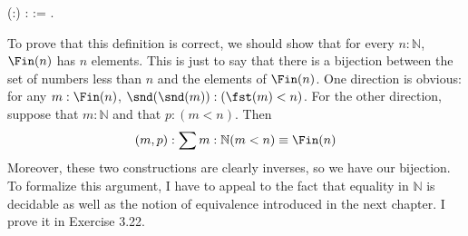\begin{coqdoccode}
\coqdocemptyline
\coqdocnoindent
{}  (:) :  :=     .\coqdoceol
\coqdocemptyline
\end{coqdoccode}
\noindent
    To prove that this definition is correct, we should show that for every $n :
    \mathbb{N}$, $\Fin(n)$ has $n$ elements.  This is just to say that there is a
    bijection between the set of numbers less than $n$ and the elements of
    $\Fin(n)$.  One direction is obvious: for any $m : \Fin(n)$,
    $\snd(\snd(m)):(\fst(m) < n)$.  For the other direction, suppose that $m :
    \mathbb{N}$ and that $p : (m < n)$.  Then
    \[
    (m, p) : \sum{m:\mathbb{N}}(m < n) \equiv \Fin(n)
    \]
    Moreover, these two constructions are clearly inverses, so we have our
    bijection.  To formalize this argument, I have to appeal to the fact that
    equality in $\mathbb{N}$ is decidable as well as the notion of equivalence
    introduced in the next chapter.  I prove it in Exercise 3.22.


